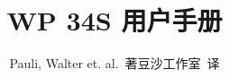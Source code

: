 \documentclass{fo-article}
\begin{document}
\title{WP 34S 用户手册}
\author{Pauli, Walter et. al.~著\newline 豆沙工作室~译}

\maketitle



\tableofcontents
\newpage


%
\end{document}
